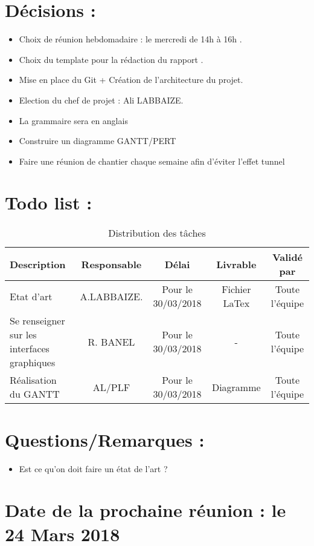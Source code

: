 \documentclass[11pt]{meetingmins}
\begin{document}
    \section{Décisions : }
    \begin{itemize}
        \item
        Choix de réunion hebdomadaire : le mercredi de 14h à 16h .
        \item
        Choix du template pour la rédaction du rapport .
        \item
        Mise en place du Git + Création de l'architecture du projet.
        \item
        Election du chef de projet : Ali LABBAIZE.
        \item La grammaire sera en anglais
        \item Construire un diagramme GANTT/PERT
        \item Faire une réunion de chantier chaque semaine afin d'éviter l'effet tunnel
        \end{itemize}

        
    \section{Todo list :}
    \begin{table}[h]
        \centering
        \begin{tabular}{|p{4cm}|c|c|c|c|}
            \hline
            \rowcolor{yellow} Description & Responsable & Délai & Livrable & Validé par
            \tabularnewline \hline
            Etat d'art & A.LABBAIZE. & Pour le 30/03/2018 & Fichier LaTex & Toute l'équipe
            \tabularnewline \hline
            Se renseigner sur les interfaces graphiques & R. BANEL & Pour le 30/03/2018 & - & Toute l'équipe
            \tabularnewline \hline
            Réalisation du GANTT  & AL/PLF & Pour le 30/03/2018 & Diagramme & Toute l'équipe 
            \tabularnewline
            \hline  
        \end{tabular}
        \caption{Distribution des tâches}
        \label{tab:my_label}
    \end{table}
    
    \section{Questions/Remarques :}
    \begin{itemize}
        \item Est ce qu'on doit faire un état de l'art ?
    \end{itemize}
    \section{Date de la prochaine réunion : \textnormal{le 24 Mars 2018} }
    
    
    
    
\end{document}

